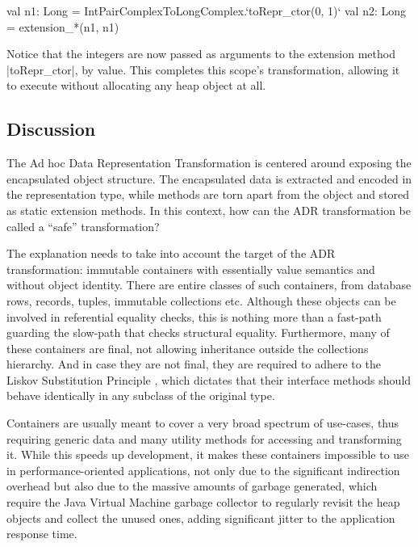 \begin{lstlisting-nobreak}
val n1: Long = IntPairComplexToLongComplex.`toRepr_ctor(0, 1)`
val n2: Long = extension_*(n1, n1)
\end{lstlisting-nobreak}

Notice that the integers are now passed as arguments to the extension method |toRepr_ctor|, by value. This completes this scope's transformation, allowing it to execute without allocating any heap object at all.



\subsection{Discussion}
\label{sec:ildl:discussion}
The Ad hoc Data Representation Transformation is centered around exposing the encapsulated object structure. The encapsulated data is extracted and encoded in the representation type, while methods are torn apart from the object and stored as static extension methods. In this context, how can the ADR transformation be called a ``safe'' transformation?

The explanation needs to take into account the target of the ADR transformation: immutable containers with essentially value semantics and without object identity. There are entire classes of such containers, from database rows, records, tuples, immutable collections etc. Although these objects can be involved in referential equality checks, this is nothing more than a fast-path guarding the slow-path that checks structural equality. Furthermore, many of these containers are final, not allowing inheritance outside the collections hierarchy. And in case they are not final, they are required to adhere to the Liskov Substitution Principle \cite{liskov-substitution-principle}, which dictates that their interface methods should behave identically in any subclass of the original type.

Containers are usually meant to cover a very broad spectrum of use-cases, thus requiring generic data and many utility methods for accessing and transforming it. While this speeds up development, it makes these containers impossible to use in performance-oriented applications, not only due to the significant indirection overhead but also due to the massive amounts of garbage generated, which require the Java Virtual Machine garbage collector to regularly revisit the heap objects and collect the unused ones, adding significant jitter to the application response time.

